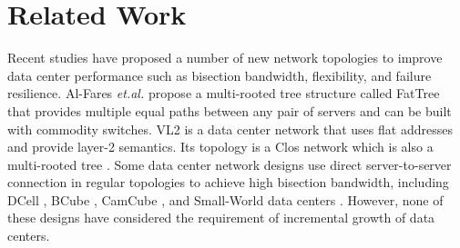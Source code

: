 \documentclass[10pt,conference]{IEEEtran}
\begin{document}
\section{Related Work}
\label{sec:related}

Recent studies have proposed a number of new network topologies to improve data center performance such as bisection bandwidth, flexibility, and failure resilience.
Al-Fares \emph{et.al.} \cite{fattree} propose a multi-rooted tree structure called FatTree
that provides multiple equal paths between any pair of servers and can be built with commodity switches.
VL2 \cite{vl2} is a data center network that uses flat addresses and provide layer-2 semantics.
Its topology is a Clos network which is also a multi-rooted tree \cite{clos}.
Some data center network designs use direct server-to-server connection in regular topologies to achieve high bisection bandwidth, including DCell \cite{DCell}, BCube \cite{BCube}, CamCube \cite{Symbiotic}, and Small-World data centers \cite{SWDC}.
However, none of these designs have considered the requirement of incremental growth of data centers.
\end{document}

